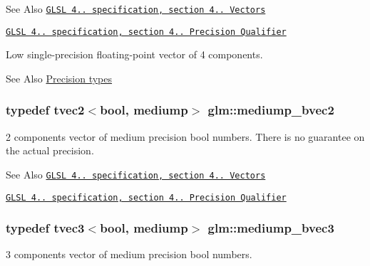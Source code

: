 \begin{DoxySeeAlso}{See Also}
\href{http://www.opengl.org/registry/doc/GLSLangSpec.4.20.8.pdf}{\tt G\-L\-S\-L 4.. specification, section 4.. Vectors} 

\href{http://www.opengl.org/registry/doc/GLSLangSpec.4.20.8.pdf}{\tt G\-L\-S\-L 4.. specification, section 4.. Precision Qualifier}
\end{DoxySeeAlso}
Low single-\/precision floating-\/point vector of 4 components. \begin{DoxySeeAlso}{See Also}
\hyperlink{group__core__precision}{Precision types} 
\end{DoxySeeAlso}
\hypertarget{group__core__precision_gaf46a55555e71730f77b5c885d20ae8e2}{
\subsubsection[{mediump\-\_\-bvec2}]{\setlength{\rightskip}{0pt plus 5cm}typedef tvec2$<$bool, mediump$>$ {\bf glm\-::mediump\-\_\-bvec2}}}\label{group__core__precision_gaf46a55555e71730f77b5c885d20ae8e2}
2 components vector of medium precision bool numbers. There is no guarantee on the actual precision.

\begin{DoxySeeAlso}{See Also}
\href{http://www.opengl.org/registry/doc/GLSLangSpec.4.20.8.pdf}{\tt G\-L\-S\-L 4.. specification, section 4.. Vectors} 

\href{http://www.opengl.org/registry/doc/GLSLangSpec.4.20.8.pdf}{\tt G\-L\-S\-L 4.. specification, section 4.. Precision Qualifier} 
\end{DoxySeeAlso}
\hypertarget{group__core__precision_ga39d35dfb49fff9cf4a6458d8027d2a8b}{
\subsubsection[{mediump\-\_\-bvec3}]{\setlength{\rightskip}{0pt plus 5cm}typedef tvec3$<$bool, mediump$>$ {\bf glm\-::mediump\-\_\-bvec3}}}\label{group__core__precision_ga39d35dfb49fff9cf4a6458d8027d2a8b}
3 components vector of medium precision bool numbers.

